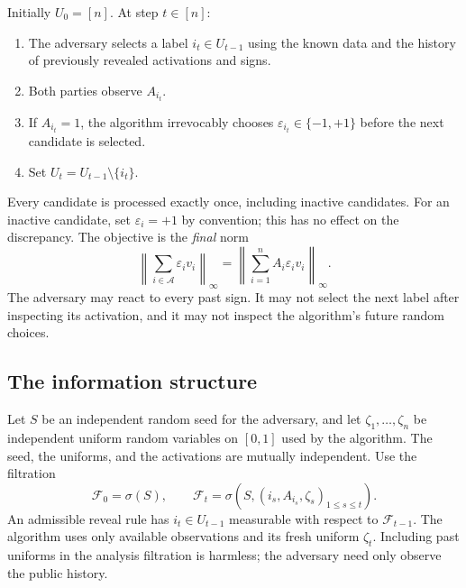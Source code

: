 \documentclass[11pt,a4paper]{article}
\numberwithin{equation}{section}
\theoremstyle{remark}
\newcommand{\F}{\mathcal F}
\begin{document}
Initially $U_0=[n]$. At step $t\in[n]$:
\begin{enumerate}
 \item The adversary selects a label $i_t\in U_{t-1}$ using the known
 data and the history of previously revealed activations and signs.
 \item Both parties observe $A_{i_t}$.
 \item If $A_{i_t}=1$, the algorithm irrevocably chooses
 $\varepsilon_{i_t}\in\{-1,+1\}$ before the next candidate is selected.
 \item Set $U_t=U_{t-1}\setminus\{i_t\}$.
\end{enumerate}
Every candidate is processed exactly once, including inactive candidates.
For an inactive candidate, set $\varepsilon_i=+1$ by convention; this has
no effect on the discrepancy. The objective is the \emph{final} norm
\begin{equation}\label{eq:discrepancy}
 \left\|\sum_{i\in\mathcal A}\varepsilon_i v_i\right\|_\infty
 =\left\|\sum_{i=1}^n A_i\varepsilon_i v_i\right\|_\infty.
\end{equation}
The adversary may react to every past sign. It may not select the next
label after inspecting its activation, and it may not inspect the
algorithm's future random choices.

\subsection{The information structure}

Let $S$ be an independent random seed for the adversary, and let
$\zeta_1,\ldots,\zeta_n$ be independent uniform random variables on $[0,1]$
used by the algorithm. The seed, the uniforms, and the activations are
mutually independent. Use the filtration
\begin{equation}\label{eq:filtration}
 \F_0=\sigma(S),\qquad
 \F_t=\sigma\!\left(S,(i_s,A_{i_s},\zeta_s)_{1\le s\le t}\right).
\end{equation}
An admissible reveal rule has $i_t\in U_{t-1}$ measurable with respect to
$\F_{t-1}$. The algorithm uses only available observations and its fresh
uniform $\zeta_t$. Including past uniforms in the analysis filtration
is harmless; the adversary need only observe the public history.
\end{document}
